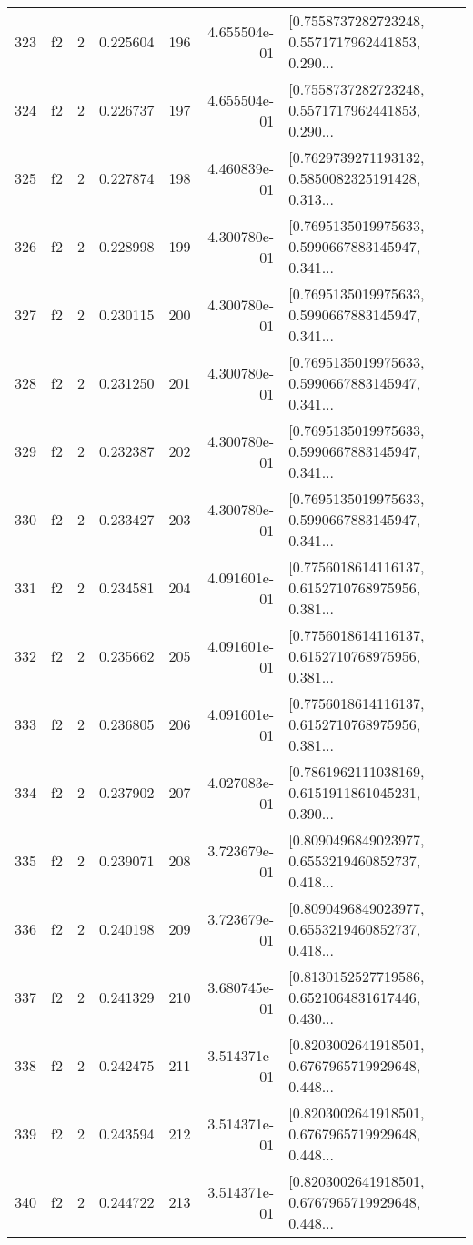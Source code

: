 \begin{tabular}{lllrlrl}
323 &  f2 &   2 &  0.225604 &  196 &  4.655504e-01 &  [0.7558737282723248, 0.5571717962441853, 0.290... \\
324 &  f2 &   2 &  0.226737 &  197 &  4.655504e-01 &  [0.7558737282723248, 0.5571717962441853, 0.290... \\
325 &  f2 &   2 &  0.227874 &  198 &  4.460839e-01 &  [0.7629739271193132, 0.5850082325191428, 0.313... \\
326 &  f2 &   2 &  0.228998 &  199 &  4.300780e-01 &  [0.7695135019975633, 0.5990667883145947, 0.341... \\
327 &  f2 &   2 &  0.230115 &  200 &  4.300780e-01 &  [0.7695135019975633, 0.5990667883145947, 0.341... \\
328 &  f2 &   2 &  0.231250 &  201 &  4.300780e-01 &  [0.7695135019975633, 0.5990667883145947, 0.341... \\
329 &  f2 &   2 &  0.232387 &  202 &  4.300780e-01 &  [0.7695135019975633, 0.5990667883145947, 0.341... \\
330 &  f2 &   2 &  0.233427 &  203 &  4.300780e-01 &  [0.7695135019975633, 0.5990667883145947, 0.341... \\
331 &  f2 &   2 &  0.234581 &  204 &  4.091601e-01 &  [0.7756018614116137, 0.6152710768975956, 0.381... \\
332 &  f2 &   2 &  0.235662 &  205 &  4.091601e-01 &  [0.7756018614116137, 0.6152710768975956, 0.381... \\
333 &  f2 &   2 &  0.236805 &  206 &  4.091601e-01 &  [0.7756018614116137, 0.6152710768975956, 0.381... \\
334 &  f2 &   2 &  0.237902 &  207 &  4.027083e-01 &  [0.7861962111038169, 0.6151911861045231, 0.390... \\
335 &  f2 &   2 &  0.239071 &  208 &  3.723679e-01 &  [0.8090496849023977, 0.6553219460852737, 0.418... \\
336 &  f2 &   2 &  0.240198 &  209 &  3.723679e-01 &  [0.8090496849023977, 0.6553219460852737, 0.418... \\
337 &  f2 &   2 &  0.241329 &  210 &  3.680745e-01 &  [0.8130152527719586, 0.6521064831617446, 0.430... \\
338 &  f2 &   2 &  0.242475 &  211 &  3.514371e-01 &  [0.8203002641918501, 0.6767965719929648, 0.448... \\
339 &  f2 &   2 &  0.243594 &  212 &  3.514371e-01 &  [0.8203002641918501, 0.6767965719929648, 0.448... \\
340 &  f2 &   2 &  0.244722 &  213 &  3.514371e-01 &  [0.8203002641918501, 0.6767965719929648, 0.448... \\

\end{tabular}

